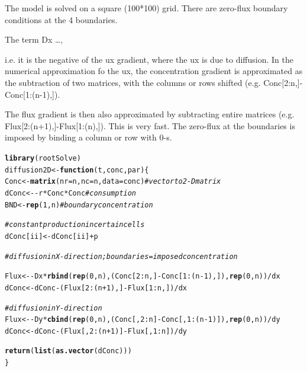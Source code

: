 \documentclass{tufte-handout}\usepackage[]{graphicx}\usepackage[]{color}
\makeatletter
\newcommand{\hlnum}[1]{\textcolor[rgb]{0.686,0.059,0.569}{#1}}%
\newcommand{\hlcom}[1]{\textcolor[rgb]{0.678,0.584,0.686}{\textit{#1}}}%
\newcommand{\hlopt}[1]{\textcolor[rgb]{0,0,0}{#1}}%
\newcommand{\hlstd}[1]{\textcolor[rgb]{0.345,0.345,0.345}{#1}}%
\newcommand{\hlkwa}[1]{\textcolor[rgb]{0.161,0.373,0.58}{\textbf{#1}}}%
\newcommand{\hlkwb}[1]{\textcolor[rgb]{0.69,0.353,0.396}{#1}}%
\newcommand{\hlkwc}[1]{\textcolor[rgb]{0.333,0.667,0.333}{#1}}%
\newcommand{\hlkwd}[1]{\textcolor[rgb]{0.737,0.353,0.396}{\textbf{#1}}}%
\newenvironment{kframe}{%
 \def\at@end@of@kframe{}%
 \ifinner\ifhmode%
  \def\at@end@of@kframe{\end{minipage}}%
  \begin{minipage}{\columnwidth}%
 \fi\fi%
 \def\FrameCommand##1{\hskip\@totalleftmargin \hskip-\fboxsep
 \colorbox{shadecolor}{##1}\hskip-\fboxsep
     \hskip-\linewidth \hskip-\@totalleftmargin \hskip\columnwidth}%
 \MakeFramed {\advance\hsize-\width
   \@totalleftmargin\z@ \linewidth\hsize
   \@setminipage}}%
 {\par\unskip\endMakeFramed%
 \at@end@of@kframe}
\newenvironment{knitrout}{}{} %
\makeatother
\begin{document}
The model is solved on a square (100*100) grid. There are zero-flux boundary conditions at
the 4 boundaries.

The term Dx \ldots, 

i.e. it is the negative of the 
ux gradient, where the ux is due to diffusion. In the numerical approximation fo the 
ux, the concentration gradient is approximated as the subtraction of two matrices, with the columns or rows shifted (e.g. Conc[2:n,]-Conc[1:(n-1),]).

The flux gradient is then also approximated by subtracting entire matrices (e.g. Flux[2:(n+1),]-Flux[1:(n),]). This is very fast. The zero-flux at the boundaries is imposed by binding a column or row with 0-s.


\begin{knitrout}
\color{fgcolor}\begin{kframe}
\begin{alltt}
\hlkwd{library}\hlstd{(rootSolve)}
\hlstd{diffusion2D} \hlkwb{<-} \hlkwa{function}\hlstd{(}\hlkwc{t}\hlstd{,}\hlkwc{conc}\hlstd{,}\hlkwc{par}\hlstd{)\{}
\hlstd{Conc} \hlkwb{<-} \hlkwd{matrix}\hlstd{(}\hlkwc{nr}\hlstd{=n,}\hlkwc{nc}\hlstd{=n,}\hlkwc{data}\hlstd{=conc)} \hlcom{# vector to 2-D matrix}
\hlstd{dConc} \hlkwb{<-} \hlopt{-}\hlstd{r}\hlopt{*}\hlstd{Conc}\hlopt{*}\hlstd{Conc} \hlcom{# consumption}
\hlstd{BND} \hlkwb{<-} \hlkwd{rep}\hlstd{(}\hlnum{1}\hlstd{,n)} \hlcom{# boundary concentration}

\hlcom{# constant production in certain cells}
\hlstd{dConc[ii]}\hlkwb{<-} \hlstd{dConc[ii]}\hlopt{+} \hlstd{p}

\hlcom{#diffusion in X-direction; boundaries=imposed concentration}

\hlstd{Flux} \hlkwb{<-} \hlopt{-}\hlstd{Dx} \hlopt{*} \hlkwd{rbind}\hlstd{(}\hlkwd{rep}\hlstd{(}\hlnum{0}\hlstd{,n),(Conc[}\hlnum{2}\hlopt{:}\hlstd{n,]}\hlopt{-}\hlstd{Conc[}\hlnum{1}\hlopt{:}\hlstd{(n}\hlopt{-}\hlnum{1}\hlstd{),]),}\hlkwd{rep}\hlstd{(}\hlnum{0}\hlstd{,n))}\hlopt{/}\hlstd{dx}
\hlstd{dConc} \hlkwb{<-} \hlstd{dConc} \hlopt{-} \hlstd{(Flux[}\hlnum{2}\hlopt{:}\hlstd{(n}\hlopt{+}\hlnum{1}\hlstd{),]}\hlopt{-}\hlstd{Flux[}\hlnum{1}\hlopt{:}\hlstd{n,])}\hlopt{/}\hlstd{dx}

\hlcom{#diffusion in Y-direction}
\hlstd{Flux} \hlkwb{<-} \hlopt{-}\hlstd{Dy} \hlopt{*} \hlkwd{cbind}\hlstd{(}\hlkwd{rep}\hlstd{(}\hlnum{0}\hlstd{,n),(Conc[,}\hlnum{2}\hlopt{:}\hlstd{n]}\hlopt{-}\hlstd{Conc[,}\hlnum{1}\hlopt{:}\hlstd{(n}\hlopt{-}\hlnum{1}\hlstd{)]),}\hlkwd{rep}\hlstd{(}\hlnum{0}\hlstd{,n))}\hlopt{/}\hlstd{dy}
\hlstd{dConc} \hlkwb{<-} \hlstd{dConc} \hlopt{-} \hlstd{(Flux[,}\hlnum{2}\hlopt{:}\hlstd{(n}\hlopt{+}\hlnum{1}\hlstd{)]}\hlopt{-}\hlstd{Flux[,}\hlnum{1}\hlopt{:}\hlstd{n])}\hlopt{/}\hlstd{dy}

\hlkwd{return}\hlstd{(}\hlkwd{list}\hlstd{(}\hlkwd{as.vector}\hlstd{(dConc)))}
\hlstd{\}}
\end{alltt}
\end{kframe}
\end{knitrout}
\end{document}
